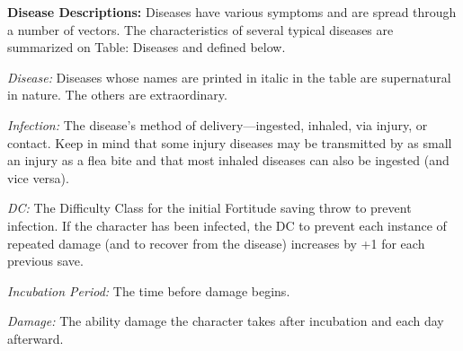 \textbf{Disease Descriptions:} Diseases have various symptoms and are spread through a number of vectors. The characteristics of several typical diseases are summarized on Table: Diseases and defined below.

\textit{Disease:} Diseases whose names are printed in italic in the table are supernatural in nature. The others are extraordinary.

\textit{Infection:} The disease's method of delivery---ingested, inhaled, via injury, or contact. Keep in mind that some injury diseases may be transmitted by as small an injury as a flea bite and that most inhaled diseases can also be ingested (and vice versa).

\textit{DC:} The Difficulty Class for the initial Fortitude saving throw to prevent infection. If the character has been infected, the DC to prevent each instance of repeated damage (and to recover from the disease) increases by +1 for each previous save.

\textit{Incubation Period:} The time before damage begins.

\textit{Damage:} The ability damage the character takes after incubation and each day afterward.


